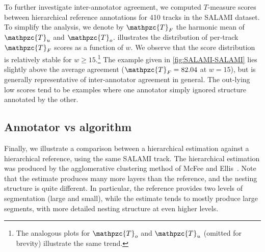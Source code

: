 \documentclass{article}
\def\shag{\ensuremath{\mathpzc{T}}}
\begin{document}
To further investigate inter-annotator agreement, we computed $T$-measure scores between hierarchical
reference annotations for 410 tracks in the SALAMI dataset.  To simplify the analysis, we denote by $\shag_F$
the harmonic mean of $\shag_u$ and $\shag_o$.   illustrates the distribution of
per-track $\shag_F$ scores as a function of $w$.  We observe that the score distribution is relatively stable
for $w \geq 15$.\footnote{The analogous plots for $\shag_o$ and $\shag_u$ (omitted for brevity) illustrate the same
trend.} 
The example given in \cref{fig:SALAMI-SALAMI} lies slightly above the average agreement ($\shag_F = 82.04$ at
$w=15$),
but is generally representative of inter-annotator agreement in general.
The out-lying low scores tend to be examples where one annotator simply ignored structure annotated
by the other.

\subsection{Annotator vs algorithm}
Finally, we illustrate a comparison between a hierarchical estimation against a hierarchical reference, using the same SALAMI track.
The hierarchical estimation was produced by the agglomerative clustering method of McFee and Ellis~\cite{McFee2014}.
Note that the estimate produces many more layers than the reference, and the nesting structure is quite different.
In particular, the reference provides two levels of segmentation (large and small), while the estimate tends to mostly produce large segments, with more detailed nesting structure at even higher levels.
\end{document}
